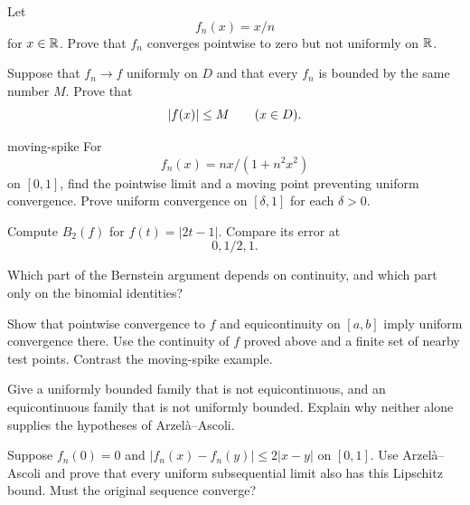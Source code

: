 \begin{exercise}
Let
\[
f_n(x)=x/n
\]
 for $x\in\mathbb{R}$.
Prove that $f_n$ converges pointwise to zero but not uniformly on $\mathbb{R}$.
\end{exercise}

\begin{exercise}
Suppose that $f_n\to f$ uniformly on $D$ and that every $f_n$ is bounded by the same number $M$. Prove that
\[
\lvert f(x)\rvert\leq M
\qquad(x\in D).
\]
\end{exercise}

\begin{hexercise}{moving-spike}
For
\[
f_n(x)=nx/(1+n^2x^2)
\]
 on $[0,1]$, find the pointwise limit and
a moving point preventing uniform convergence. Prove uniform convergence
on $[\delta,1]$ for each $\delta>0$.
\end{hexercise}
\begin{exercise}
Compute $B_2(f)$ for $f(t)=|2t-1|$. Compare its error at
\[
0,1/2,1.
\]

Which part of the Bernstein argument depends on continuity, and which
part only on the binomial identities?
\end{exercise}
\begin{exercise}
Show that pointwise convergence to $f$ and equicontinuity on $[a,b]$
imply uniform convergence there. Use the continuity of $f$ proved above
and a finite set of nearby test points. Contrast the moving-spike example.
\end{exercise}
\begin{exercise}
Give a uniformly bounded family that is not equicontinuous, and an
equicontinuous family that is not uniformly bounded. Explain why neither
alone supplies the hypotheses of Arzel\`a--Ascoli.
\end{exercise}
\begin{exercise}
Suppose $f_n(0)=0$ and $|f_n(x)-f_n(y)|\leq2|x-y|$ on $[0,1]$.
Use Arzel\`a--Ascoli and prove that every uniform subsequential limit
also has this Lipschitz bound. Must the original sequence converge?
\end{exercise}
